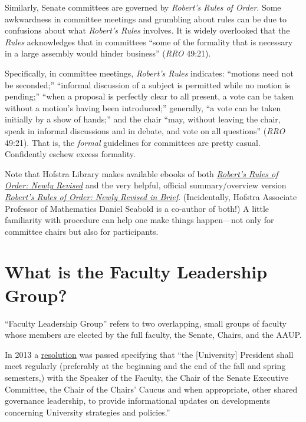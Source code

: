 \documentclass[12pt]{article}
\begin{document}
Similarly, Senate committees are governed by \emph{Robert's Rules of
Order}. Some awkwardness in committee meetings and grumbling about rules
can be due to confusions about what \emph{Robert's Rules} involves. It
is widely overlooked that the \emph{Rules} acknowledges that in
committees ``some of the formality that is necessary in a large assembly
would hinder business'' (\emph{RRO} 49:21).

Specifically, in committee meetings, \emph{Robert's Rules} indicates:
``motions need not be seconded;'' ``informal discussion of a subject is
permitted while no motion is pending;'' ``when a proposal is perfectly
clear to all present, a vote can be taken without a motion's having been
introduced;'' generally, ``a vote can be taken initially by a show of
hands;'' and the chair ``may, without leaving the chair, speak in
informal discussions and in debate, and vote on all questions''
(\emph{RRO} 49:21). That is, the \emph{formal} guidelines for committees
are pretty casual. Confidently eschew excess formality.

Note that Hofstra Library makes available ebooks of both
\href{https://hofstra.on.worldcat.org/oclc/1192561100}{\emph{Robert's
Rules of Order: Newly Revised}} and the very helpful, official
summary/overview version
\href{https://hofstra.on.worldcat.org/oclc/1192973323}{\emph{Robert's
Rules of Order: Newly Revised in Brief}}. (Incidentally, Hofstra
Associate Professor of Mathematics Daniel Seabold is a co-author of
both!) A little familiarity with procedure can help one make things
happen---not only for committee chairs but also for participants.

\section{What is the Faculty Leadership
Group?}\label{what-is-the-faculty-leadership-group}

``Faculty Leadership Group'' refers to two overlapping, small groups of
faculty whose members are elected by the full faculty, the Senate,
Chairs, and the AAUP.

In 2013 a
\href{https://www.hofstra.edu/pdf/faculty/senate/senate_resolution_informational_meetings.pdf}{resolution}
was passed specifying that ``the {[}University{]} President shall meet
regularly (preferably at the beginning and the end of the fall and
spring semesters,) with the Speaker of the Faculty, the Chair of the
Senate Executive Committee, the Chair of the Chairs' Caucus and when
appropriate, other shared governance leadership, to provide
informational updates on developments concerning University strategies
and policies.''
\end{document}
